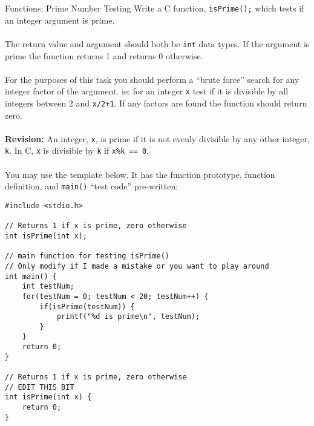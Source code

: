 \documentclass{lab}
\begin{document}
\pagebreak
\begin{task}{Functions: Prime Number Testing}{}
Write a C function, \texttt{isPrime();} which tests if an integer argument is prime.
\\~\\
The return value and argument should both be \texttt{int} data types. If the argument is prime the function returns 1 and returns 0 otherwise.
\\~\\
For the purposes of this task you should perform a ``brute force'' search for any integer factor of the argument. ie: for an integer \texttt{x} test if it is divisible by all integers between 2 and \texttt{x/2+1}. If any factors are found the function should return zero.
\\~\\
\textbf{Revision:} An integer, \texttt{x}, is prime if it is not evenly divisible by any other integer, \texttt{k}. In C, \texttt{x} is divisible by \texttt{k} if \texttt{x\%k == 0}.
\\~\\
You may use the template below. It has the function prototype, function definition, and \texttt{main()} ``test code'' pre-written:
\begin{lstlisting}[style=Ctable]
#include <stdio.h>

// Returns 1 if x is prime, zero otherwise
int isPrime(int x);

// main function for testing isPrime()
// Only modify if I made a mistake or you want to play around
int main() {
	int testNum;
	for(testNum = 0; testNum < 20; testNum++) {
		if(isPrime(testNum)) {
			printf("%d is prime\n", testNum);
		}
	}
	return 0;
}

// Returns 1 if x is prime, zero otherwise
// EDIT THIS BIT
int isPrime(int x) {
	return 0;
}
\end{lstlisting}
\end{task}
\end{document}

